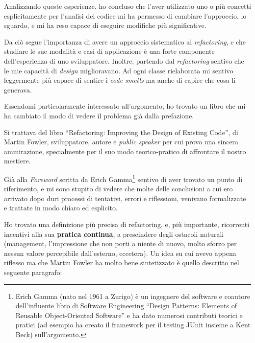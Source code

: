 \documentclass[12pt]{report}
\begin{document}
Analizzando queste esperienze, ho concluso che l'aver utilizzato uno o più
concetti esplicitamente per l'analisi del codice mi ha permesso di
cambiare l'approccio, lo sguardo, e mi ha reso capace di eseguire
modifiche più significative.

Da ciò segue l'importanza di avere un approccio sistematico al 
\textit{refactoring}, e che studiare le sue modalità e casi di applicazione
è una forte componente dell'esperienza di uno sviluppatore. Inoltre, partendo
dal \textit{refactoring} sentivo che le mie capacità di \textit{design}
miglioravano. Ad ogni classe rielaborata mi sentivo leggermente più
capace di sentire i \textit{code smells} ma anche di capire 
che cosa li generava.

Essendomi particolarmente interessato all'argomento, ho trovato un libro 
che mi ha cambiato il modo di vedere il problema già dalla prefazione.

Si trattava del libro ``Refactoring: Improving the Design of
Existing Code''\cite{fowler2002}, di Martin Fowler, sviluppatore, 
autore e \textit{public speaker} per cui provo una sincera ammirazione,
specialmente per il suo modo teorico-pratico di affrontare il nostro
mestiere. 

Già alla \textit{Foreword} scritta da Erich Gamma\footnote{
Erich Gamma (nato nel 1961 a Zurigo) è un ingegnere del software e
coautore dell'influente libro di Software Engineering ``Design Patterns: 
Elements of Reusable Object-Oriented Software'' e ha dato numerosi contributi
teorici e pratici (ad esempio ha creato il framework per il testing 
JUnit insieme a Kent Beck) sull'argomento.
}
sentivo di aver trovato un punto di riferimento, e mi sono stupito di
vedere che molte delle conclusioni a cui ero arrivato dopo
duri processi di tentativi, errori e riflessioni, venivano formalizzate
e trattate in modo chiaro ed esplicito.

Ho trovato una definizione più precisa di refactoring, e, più importante, 
ricorrenti incentivi alla sua 
\textbf{pratica continua}, a prescindere degli ostacoli naturali (management, 
l'impressione che non porti a niente di nuovo, molto sforzo per nessun valore
percepibile dall'esterno, eccetera). Un idea su cui avevo appena riflesso
ma che Martin Fowler ha molto bene sintetizzato è quello descritto nel
seguente paragrafo:
\end{document}
